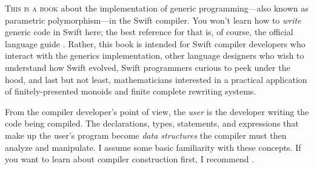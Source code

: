\documentclass[../generics]{subfiles}
\begin{document}


\lettrine{T}{his is a book} about the implementation of generic programming---also known as parametric polymorphism---in the Swift compiler. You won't learn how to \emph{write} generic code in Swift here; the best reference for that is, of course, the official language guide \cite{tspl}. Rather, this book is intended for Swift compiler developers who interact with the generics implementation, other language designers who wish to understand how Swift evolved, Swift programmers curious to peek under the hood, and last but not least, mathematicians interested in a practical application of finitely-presented monoids and finite complete rewriting systems.

From the compiler developer's point of view, the \emph{user} is the developer writing the code being compiled. The declarations, types, statements, and expressions that make up the user's program become \emph{data structures} the compiler must then analyze and manipulate. I assume some basic familiarity with these concepts. If you want to learn about compiler construction first, I recommend \cite{muchnick1997advanced,cooper2004engineering,appel,incrementalracket,craftinginterpreter}.
\end{document}
